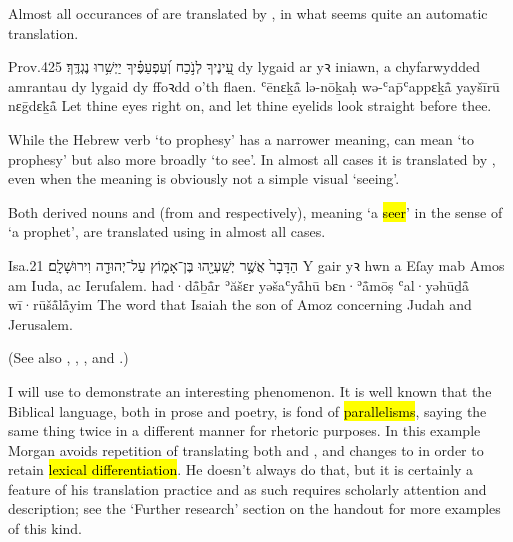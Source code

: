 Almost all occurances of  are translated by , in what seems quite an automatic translation.

\begin{example}{Prov.}{4}{25}{}{}
	\quoling
	{עֵ֭ינֶיךָ לְנֹ֣כַח  וְ֝עַפְעַפֶּ֗יךָ יַיְשִׁ֥רוּ נֶגְדֶּֽךָ׃}
	{ dy lygaid ar yꝛ iniawn, a chyfarwydded amrantau dy lygaid dy ffoꝛdd o’th flaen.}
	{ʿēnɛḵå̄ lə-nōḵaḥ  wə-ʿap̄ʿappɛḵå̄ yayšīrū nɛḡdɛḵå̄}
	{Let thine eyes  right on, and let thine eyelids look straight before thee.}
\end{example}




\begin{paper}
	{\click} While the Hebrew verb  ‘to prophesy’ has a narrower meaning,  can mean ‘to prophesy’ but also more broadly ‘to see’. In almost all cases it is translated by , even when the meaning is obviously not a simple visual ‘seeing’.

	Both derived nouns  and  (from  and  respectively), meaning ‘a \hl{seer}’ in the sense of ‘a prophet’, are translated using  in almost all cases.
\end{paper}

\begin{example}{Isa.}{2}{1}{}{}
	\quoling
	{הַדָּבָר֙ אֲשֶׁ֣ר 	יְשַֽׁעְיָ֖הוּ בֶּן־אָמ֑וֹץ עַל־יְהוּדָ֖ה וִירוּשָׁלִָֽם׃}
	{Y gair yꝛ hwn a  Eſay mab Amos am Iuda, ac Ieruſalem.}
	{had·då̄ḇå̄r ʾăšɛr  yəšaʿyå̄hū bɛn·ʾå̄mōṣ ʿal·yəhūḏå̄ wī·rūšå̄lå̄yim}
	{The word that Isaiah the son of Amoz  concerning Judah and Jerusalem.}
\end{example}
(See also , , ,  and .)

\begin{paper}
	I will use  to demonstrate an interesting phenomenon. It is well known that the Biblical language, both in prose and poetry, is fond of \hl{parallelisms}, saying the same thing twice in a different manner for rhetoric purposes. In this example Morgan avoids repetition of  translating both  and , and changes   to  in order to retain \hl{lexical differentiation}. He doesn’t always do that, but it is certainly a feature of his translation practice and as such requires scholarly attention and description; see the ‘Further research’ section on the handout for more examples of this kind.
\end{paper}

